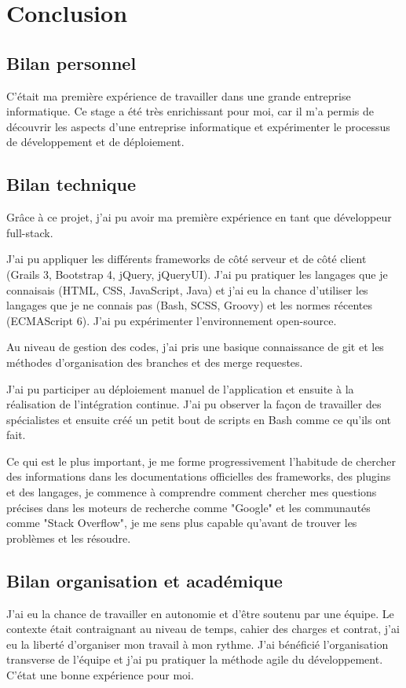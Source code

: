 \chapter{Conclusion}
\label{chap:Conclusion}

\section{Bilan personnel}
C'était ma première expérience de travailler dans une grande entreprise informatique.
Ce stage a été très enrichissant pour moi,
car il m’a permis de découvrir les aspects d'une entreprise informatique et expérimenter le processus de développement et de déploiement.

\section{Bilan technique}
Grâce à ce projet, j'ai pu avoir ma première expérience en tant que développeur full-stack.

J'ai pu appliquer les différents frameworks de côté serveur et de côté client (Grails 3, Bootstrap 4, jQuery, jQueryUI).
J'ai pu pratiquer les langages que je connaisais (HTML, CSS, JavaScript, Java)
et j'ai eu la chance d'utiliser les langages que je ne connais pas (Bash, SCSS, Groovy) et les normes récentes (ECMAScript 6).
J'ai pu expérimenter l'environnement open-source.

Au niveau de gestion des codes, j'ai pris une basique connaissance de git et les méthodes d'organisation des branches et des merge requestes.

J'ai pu participer au déploiement manuel de l'application et ensuite à la réalisation de l'intégration continue.
J'ai pu observer la façon de travailler des spécialistes et ensuite créé un petit bout de scripts en Bash comme ce qu'ils ont fait.

Ce qui est le plus important,
je me forme progressivement l'habitude de chercher des informations dans les documentations officielles des frameworks, des plugins et des langages,
je commence à comprendre comment chercher mes questions précises dans les moteurs de recherche comme "Google" et les communautés comme "Stack Overflow",
je me sens plus capable qu'avant de trouver les problèmes et les résoudre.

\section{Bilan organisation et académique}
J'ai eu la chance de travailler en autonomie et d'être soutenu par une équipe.
Le contexte était contraignant au niveau de temps, cahier des charges et contrat,
j'ai eu la liberté d'organiser mon travail à mon rythme.
J'ai bénéficié l'organisation transverse de l'équipe et j'ai pu pratiquer la méthode agile du développement.
C'état une bonne expérience pour moi.
